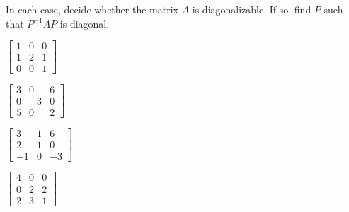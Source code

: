 \documentclass{ximera}
\begin{document}
\begin{problem}
In each case, decide whether the matrix $A$ is diagonalizable. If so, find $P$ such that $P^{-1}AP$ is diagonal.

\begin{problem}
\item $\begin{bmatrix}
1 & 0 & 0 \\
1 & 2 & 1 \\
0 & 0 & 1
\end{bmatrix}$
\item $\begin{bmatrix}
3 &  0 & 6 \\
0 & -3 & 0 \\
5 &  0 & 2
\end{bmatrix}$
\item $\begin{bmatrix}
 3 &  1 &  6 \\
 2 &  1 &  0 \\
-1 &  0 & -3
\end{bmatrix}$
\item $\begin{bmatrix}
4 & 0 & 0 \\
0 & 2 & 2 \\
2 & 3 & 1
\end{bmatrix}$
\end{problem}


\end{problem}
\end{document}
